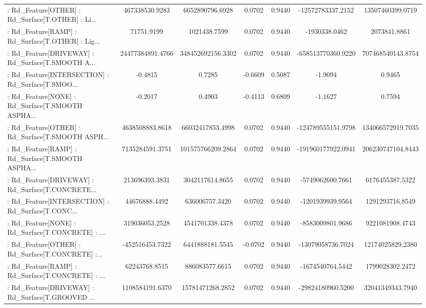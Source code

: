 \begin{longtable}{p{4cm}cccccc}
 : Rd\_Feature[OTHER] : Rd\_Surface[T.OTHER] : Li... &    467338530.9283 &   6652890796.6928 &  0.0702 &       0.9440 &  -12572783337.2152 &  13507460399.0719 \\
 : Rd\_Feature[RAMP] : Rd\_Surface[T.OTHER] : Lig... &        71751.9199 &      1021438.7599 &  0.0702 &       0.9440 &      -1930338.0462 &      2073841.8861 \\
 : Rd\_Feature[DRIVEWAY] : Rd\_Surface[T.SMOOTH A... &  24477384891.4766 & 348452692156.3302 &  0.0702 &       0.9440 & -658513770360.9220 & 707468540143.8754 \\
 : Rd\_Feature[INTERSECTION] : Rd\_Surface[T.SMOO... &           -0.4815 &            0.7285 & -0.6609 &       0.5087 &            -1.9094 &            0.9465 \\
 : Rd\_Feature[NONE] : Rd\_Surface[T.SMOOTH ASPHA... &           -0.2017 &            0.4903 & -0.4113 &       0.6809 &            -1.1627 &            0.7594 \\
 : Rd\_Feature[OTHER] : Rd\_Surface[T.SMOOTH ASPH... &   4638508883.8618 &  66032417853.4998 &  0.0702 &       0.9440 & -124789555151.9798 & 134066572919.7035 \\
 : Rd\_Feature[RAMP] : Rd\_Surface[T.SMOOTH ASPHA... &   7135284591.3751 & 101575766209.2864 &  0.0702 &       0.9440 & -191960177922.0941 & 206230747104.8443 \\
 : Rd\_Feature[DRIVEWAY] : Rd\_Surface[T.CONCRETE... &    213696393.3831 &   3042117614.8655 &  0.0702 &       0.9440 &   -5749062600.7661 &   6176455387.5322 \\
 : Rd\_Feature[INTERSECTION] : Rd\_Surface[T.CONC... &     44676888.4492 &    636006757.3420 &  0.0702 &       0.9440 &   -1201939939.9564 &   1291293716.8549 \\
 : Rd\_Feature[NONE] : Rd\_Surface[T.CONCRETE] : ... &    319036053.2528 &   4541701338.4378 &  0.0702 &       0.9440 &   -8583009801.9686 &   9221081908.4743 \\
 : Rd\_Feature[OTHER] : Rd\_Surface[T.CONCRETE] :... &   -452516453.7322 &   6441888181.5545 & -0.0702 &       0.9440 &  -13079058736.7024 &  12174025829.2380 \\
 : Rd\_Feature[RAMP] : Rd\_Surface[T.CONCRETE] : ... &     62243768.8515 &    886083577.6615 &  0.0702 &       0.9440 &   -1674540764.5442 &   1799028302.2472 \\
 : Rd\_Feature[DRIVEWAY] : Rd\_Surface[T.GROOVED ... &   1108584191.6370 &  15781471268.2852 &  0.0702 &       0.9440 &  -29824180960.5200 &  32041349343.7940 \\

\end{longtable}
